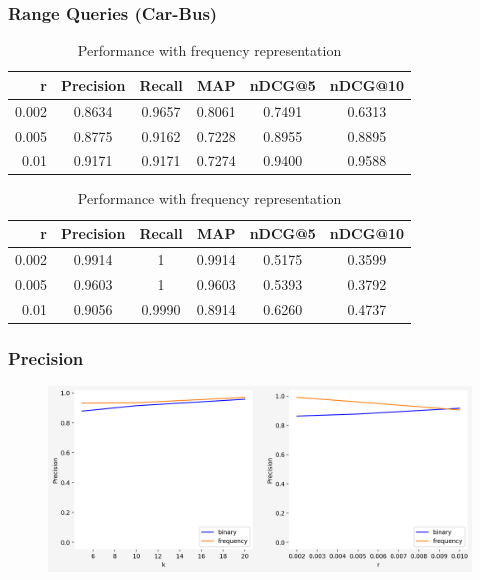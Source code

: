 \documentclass{beamer}
\begin{document}
\begin{frame}
\frametitle{Range Queries (Car-Bus)} 
\begin{block}{} \vspace{-3mm}
\begin{table}[!htbp]
{\footnotesize
\centering
\begin{tabular}{rccccc}
 	{\bf r } 	& {\bf Precision}& {\bf Recall}	&	{\bf MAP}	 & {\bf nDCG@5}	& {\bf nDCG@10} \\ \midrule
 	0.002   	& 	0.8634    	& 	0.9657 	&	0.8061	 & 0.7491			& 0.6313	\\ \midrule
	0.005   	& 	0.8775    	& 	0.9162 	&	0.7228	 & 0.8955			& 0.8895	\\ \midrule
 	0.01 		&   	0.9171   	&      0.9171	&	0.7274	 & 0.9400  		& 0.9588	\\ \bottomrule
\end{tabular} 
\caption{\footnotesize Performance with binary representation} \vspace{3mm}

\centering
\begin{tabular}{rccccc}
 	{\bf r } 	& {\bf Precision}& {\bf Recall}	&	{\bf MAP}	 & {\bf nDCG@5}	& {\bf nDCG@10} \\ \midrule
 	0.002   	& 	0.9914    	& 	1 		&	0.9914	 & 0.5175			& 0.3599	\\ \midrule
	0.005  	& 	0.9603    	& 	1 		&	0.9603	 & 0.5393			& 0.3792	\\ \midrule
 	0.01 		&   	0.9056   	&      0.9990	&	0.8914	 & 0.6260  		& 0.4737	\\ \bottomrule
\end{tabular} 
\caption{\footnotesize Performance with frequency representation}
\label{table: car-bus multipass} 
}
\end{table}
\end{block}
\end{frame}


\begin{frame}
\frametitle{Precision} 
\begin{block}{} \vspace{-1cm}
\begin{figure}[h] 
\includegraphics[width=1 \textwidth]{Precision} 
\end{figure}
\end{block}
\end{frame}
\end{document}
